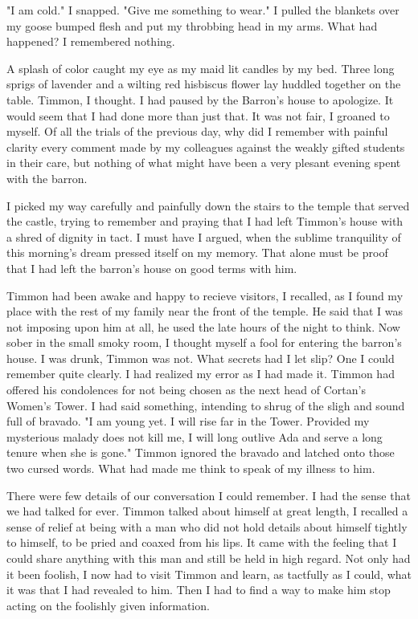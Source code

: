 \documentclass{article}
\begin{document}
"I am cold." I snapped. "Give me something to wear." I pulled the blankets over my goose bumped flesh and put my throbbing head in my arms. What had happened? I remembered nothing. 

A splash of color caught my eye as my maid lit candles by my bed. Three long sprigs of lavender and a wilting red hisbiscus flower lay huddled together on the table. Timmon, I thought. I had paused by the Barron's house to apologize. It would seem that I had done more than just that. It was not fair, I groaned to myself. Of all the trials of the previous day, why did I remember with painful clarity every comment made by my colleagues against the weakly gifted students in their care, but nothing of what might have been a very plesant evening spent with the barron. 

I picked my way carefully and painfully down the stairs to the temple that served the castle, trying to remember and praying that I had left Timmon's house with a shred of dignity in tact. I must have I argued, when the sublime tranquility of this morning's dream pressed itself on my memory. That alone must be proof that I had left the barron's house on good terms with him. 

Timmon had been awake and happy to recieve visitors, I recalled, as I found my place with the rest of my family near the front of the temple. He said that I was not imposing upon him at all, he used the late hours of the night to think. Now sober in the small smoky room, I thought myself a fool for entering the barron's house. I was drunk, Timmon was not. What secrets had I let slip? One I could remember quite clearly. I had realized my error as I had made it. Timmon had offered his condolences for not being chosen as the next head of Cortan's Women's Tower. I had said something, intending to shrug of the sligh and sound full of bravado. "I am young yet. I will rise far in the Tower. Provided my mysterious malady does not kill me, I will long outlive Ada and serve a long tenure when she is gone." Timmon ignored the bravado and latched onto those two cursed words. What had made me think to speak of my illness to him.

There were few details of our conversation I could remember. I had the sense that we had talked for ever. Timmon talked about himself at great length, I recalled a sense of relief at being with a man who did not hold details about himself tightly to himself, to be pried and coaxed from his lips. It came with the feeling that I could share anything with this man and still be held in high regard. Not only had it been foolish, I now had to visit Timmon and learn, as tactfully as I could, what it was that I had revealed to him. Then I had to find a way to make him stop acting on the foolishly given information.
\end{document}
